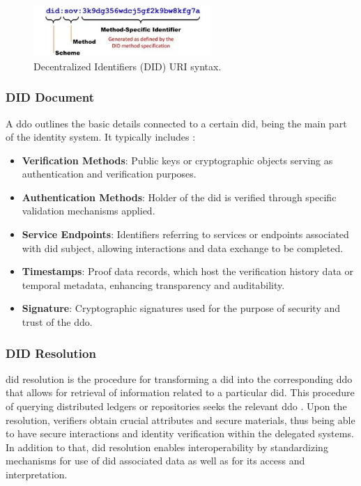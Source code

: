 \begin{figure}[h]  
  \centering
  \includegraphics[width=0.6\textwidth]{Images/c4_1.png} 
  \caption{Decentralized Identifiers (DID) URI syntax.}
\end{figure}

\subsubsection{DID Document}

A \gls{ddo} outlines the basic details connected to a certain \gls{did}, being the main part of the identity system. It typically includes \cite{9869618}:

\begin{itemize}
  \item \textbf{Verification Methods}: Public keys or cryptographic objects serving as authentication and verification purposes.
  \item \textbf{Authentication Methods}: Holder of the \gls{did} is verified through specific validation mechanisms applied.
  \item \textbf{Service Endpoints}: Identifiers referring to services or endpoints associated with \gls{did} subject, allowing interactions and data exchange to be completed.
  \item \textbf{Timestamps}: Proof data records, which host the verification history data or temporal metadata, enhancing transparency and auditability.
  \item \textbf{Signature}: Cryptographic signatures used for the purpose of security and trust of the \gls{ddo}.
\end{itemize}

\subsubsection{DID Resolution}

\gls{did} resolution is the procedure for transforming a \gls{did} into the corresponding \gls{ddo} that allows for retrieval of information related to a particular \gls{did}. This 
procedure of querying distributed ledgers or repositories seeks the relevant \gls{ddo} \cite{w3didcore}. Upon the resolution, verifiers obtain crucial attributes and secure materials, 
thus being able to have secure interactions and identity verification within the delegated systems. In addition to that, \gls{did} resolution enables interoperability by 
standardizing mechanisms for use of \gls{did} associated data as well as for its access and interpretation.

